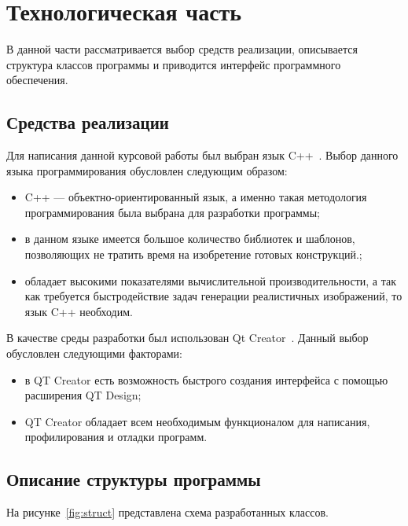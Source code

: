 \section{Технологическая часть}
В данной части рассматривается выбор средств реализации, описывается структура классов программы и приводится интерфейс программного обеспечения.

\subsection{Средства реализации}

Для написания данной курсовой работы был выбран язык C++~\cite{cpp-lang}.
Выбор данного языка программирования обусловлен следующим образом:
\begin{itemize}
	\item C++ --- объектно-ориентированный язык, а именно такая методология
	программирования была выбрана для разработки программы;
	\item в данном языке имеется большое количество библиотек и шаблонов,
	позволяющих не тратить время на изобретение готовых конструкций.;
	\item обладает высокими показателями вычислительной производительности, а так как требуется быстродействие задач генерации реалистичных изображений, то язык C++ необходим.
\end{itemize}

В качестве среды разработки был использован Qt Creator~\cite{qt-creator}.
Данный выбор обусловлен следующими факторами:
\begin{itemize}
	\item в QT Creator есть возможность быстрого создания интерфейса с помощью расширения QT Design;
	\item QT Creator обладает всем необходимым функционалом для написания, профилирования и отладки программ.
\end{itemize}

\subsection{Описание структуры программы}

На рисунке~\ref{fig:struct} представлена схема разработанных классов.

